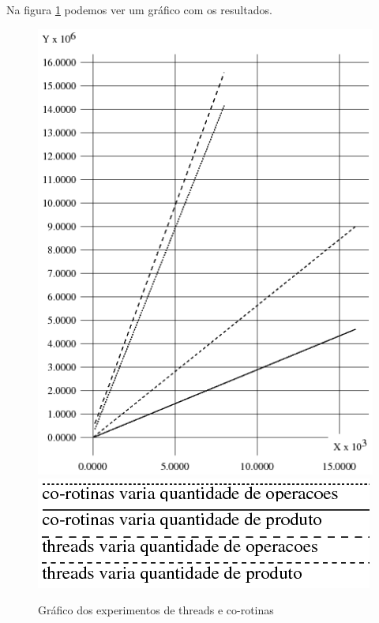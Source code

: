 Na figura \ref{grafico-experimentos-corotinas} podemos ver um gráfico com os resultados.
\begin{figure}
\centering
\includegraphics[scale=0.7]{images/grafico_coroXthreads2.png}
\includegraphics[scale=0.7]{images/legenda.png}
\caption{Gráfico dos experimentos de threads e co-rotinas}
\label{grafico-experimentos-corotinas}
\end{figure}


